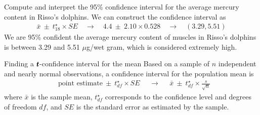 

\begin{examplewrap}
\begin{nexample}{Compute and interpret the 95\% confidence interval
    for the average mercury content in Risso's dolphins.}
  We can construct the confidence interval as
  \begin{align*}
  \bar{x} \ \pm\  t^{\star}_{18} \times SE
    \quad \to \quad 4.4 \ \pm\  2.10 \times 0.528
    \quad \to \quad (3.29, 5.51)
  \end{align*}
  We are 95\% confident the average mercury content of muscles
  in Risso's dolphins is between 3.29 and 5.51 $\mu$g/wet gram,
  which is considered extremely high.
\end{nexample}
\end{examplewrap}


\begin{onebox}{Finding a
    $\pmb{\MakeLowercase{t}}$-confidence interval
    for the mean}
  Based on a sample of $n$ independent and nearly normal
  observations, a confidence interval for the population
  mean is
  \begin{align*}
  &\text{point estimate} \ \pm\  t^{\star}_{df} \times SE
  &&\to
  &&\bar{x} \ \pm\  t^{\star}_{df} \times \frac{s}{\sqrt{n}}
  \end{align*}
  where $\bar{x}$ is the sample mean, $t^{\star}_{df}$
  corresponds to the confidence level and degrees of freedom
  $df$, and $SE$ is the standard error as estimated by
  the sample.
\end{onebox}

